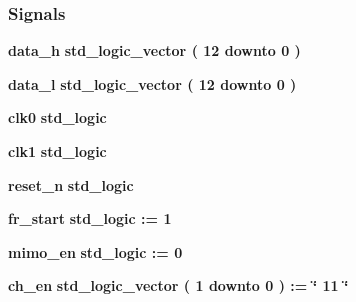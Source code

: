 \subsubsection*{Signals}
 \begin{DoxyCompactItemize}
\item 
{\bf data\+\_\+h} {\bfseries \textcolor{comment}{std\+\_\+logic\+\_\+vector}\textcolor{vhdlchar}{ }\textcolor{vhdlchar}{(}\textcolor{vhdlchar}{ }\textcolor{vhdlchar}{ } \textcolor{vhdldigit}{12} \textcolor{vhdlchar}{ }\textcolor{keywordflow}{downto}\textcolor{vhdlchar}{ }\textcolor{vhdlchar}{ } \textcolor{vhdldigit}{0} \textcolor{vhdlchar}{ }\textcolor{vhdlchar}{)}\textcolor{vhdlchar}{ }} 
\item 
{\bf data\+\_\+l} {\bfseries \textcolor{comment}{std\+\_\+logic\+\_\+vector}\textcolor{vhdlchar}{ }\textcolor{vhdlchar}{(}\textcolor{vhdlchar}{ }\textcolor{vhdlchar}{ } \textcolor{vhdldigit}{12} \textcolor{vhdlchar}{ }\textcolor{keywordflow}{downto}\textcolor{vhdlchar}{ }\textcolor{vhdlchar}{ } \textcolor{vhdldigit}{0} \textcolor{vhdlchar}{ }\textcolor{vhdlchar}{)}\textcolor{vhdlchar}{ }} 
\item 
{\bf clk0} {\bfseries \textcolor{comment}{std\+\_\+logic}\textcolor{vhdlchar}{ }} 
\item 
{\bf clk1} {\bfseries \textcolor{comment}{std\+\_\+logic}\textcolor{vhdlchar}{ }} 
\item 
{\bf reset\+\_\+n} {\bfseries \textcolor{comment}{std\+\_\+logic}\textcolor{vhdlchar}{ }} 
\item 
{\bf fr\+\_\+start} {\bfseries \textcolor{comment}{std\+\_\+logic}\textcolor{vhdlchar}{ }\textcolor{vhdlchar}{ }\textcolor{vhdlchar}{\+:}\textcolor{vhdlchar}{=}\textcolor{vhdlchar}{ }\textcolor{vhdlchar}{ }\textcolor{vhdlchar}{\textquotesingle{}}\textcolor{vhdlchar}{ } \textcolor{vhdldigit}{1} \textcolor{vhdlchar}{ }\textcolor{vhdlchar}{\textquotesingle{}}\textcolor{vhdlchar}{ }} 
\item 
{\bf mimo\+\_\+en} {\bfseries \textcolor{comment}{std\+\_\+logic}\textcolor{vhdlchar}{ }\textcolor{vhdlchar}{ }\textcolor{vhdlchar}{\+:}\textcolor{vhdlchar}{=}\textcolor{vhdlchar}{ }\textcolor{vhdlchar}{ }\textcolor{vhdlchar}{\textquotesingle{}}\textcolor{vhdlchar}{ } \textcolor{vhdldigit}{0} \textcolor{vhdlchar}{ }\textcolor{vhdlchar}{\textquotesingle{}}\textcolor{vhdlchar}{ }} 
\item 
{\bf ch\+\_\+en} {\bfseries \textcolor{comment}{std\+\_\+logic\+\_\+vector}\textcolor{vhdlchar}{ }\textcolor{vhdlchar}{(}\textcolor{vhdlchar}{ }\textcolor{vhdlchar}{ } \textcolor{vhdldigit}{1} \textcolor{vhdlchar}{ }\textcolor{keywordflow}{downto}\textcolor{vhdlchar}{ }\textcolor{vhdlchar}{ } \textcolor{vhdldigit}{0} \textcolor{vhdlchar}{ }\textcolor{vhdlchar}{)}\textcolor{vhdlchar}{ }\textcolor{vhdlchar}{ }\textcolor{vhdlchar}{ }\textcolor{vhdlchar}{\+:}\textcolor{vhdlchar}{=}\textcolor{vhdlchar}{ }\textcolor{vhdlchar}{ }\textcolor{vhdlchar}{ }\textcolor{vhdlchar}{ }\textcolor{keyword}{\char`\"{} 11 \char`\"{}}\textcolor{vhdlchar}{ }} 

\end{DoxyCompactItemize}

